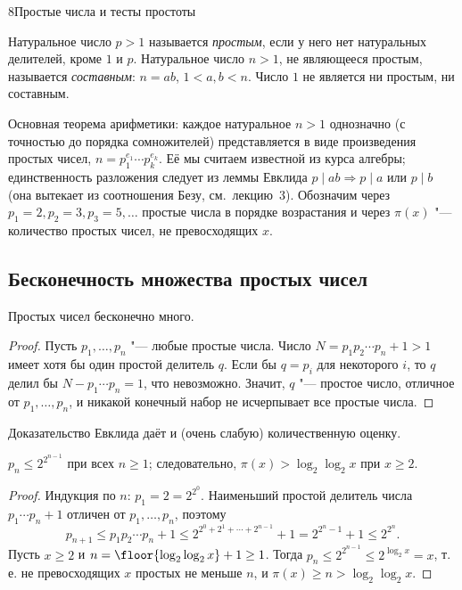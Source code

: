 \begin{lecture}{8}{Простые числа и тесты простоты}
\begin{definition}
Натуральное число $p > 1$ называется \emph{простым}, если у него нет натуральных делителей,
кроме $1$ и $p$. Натуральное число $n > 1$, не являющееся простым, называется \emph{составным}:
$n = ab$, $1 < a, b < n$. Число $1$ не является ни простым, ни составным.
\end{definition}

Основная теорема арифметики: каждое натуральное $n > 1$ однозначно (с точностью до порядка
сомножителей) представляется в виде произведения простых чисел, $n = p_1^{e_1} \cdots p_k^{e_k}$.
Её мы считаем известной из курса алгебры; единственность разложения следует из леммы Евклида
$p \mid ab \Rightarrow p \mid a$ или $p \mid b$ (она вытекает из соотношения Безу, см.\ лекцию~3).
Обозначим через $p_1 = 2, p_2 = 3, p_3 = 5, \ldots$ простые числа в порядке возрастания и через
$\pi(x)$ "--- количество простых чисел, не превосходящих $x$.

\subsection{Бесконечность множества простых чисел}

\begin{theorem}[Евклид]\label{l8:euclid}
Простых чисел бесконечно много.
\end{theorem}

\begin{proof}
Пусть $p_1, \ldots, p_n$ "--- любые простые числа. Число $N = p_1 p_2 \cdots p_n + 1 > 1$ имеет
хотя бы один простой делитель $q$. Если бы $q = p_i$ для некоторого $i$, то $q$ делил бы
$N - p_1 \cdots p_n = 1$, что невозможно. Значит, $q$ "--- простое число, отличное от
$p_1, \ldots, p_n$, и никакой конечный набор не исчерпывает все простые числа.
\end{proof}

Доказательство Евклида даёт и (очень слабую) количественную оценку.

\begin{corollary}\label{l8:loglog}
$p_n \le 2^{2^{n-1}}$ при всех $n \ge 1$; следовательно, $\pi(x) > \log_2 \log_2 x$ при $x \ge 2$.
\end{corollary}

\begin{proof}
Индукция по $n$: $p_1 = 2 = 2^{2^0}$. Наименьший простой делитель числа $p_1 \cdots p_n + 1$
отличен от $p_1, \ldots, p_n$, поэтому
\[
  p_{n+1} \le p_1 p_2 \cdots p_n + 1 \le 2^{2^0 + 2^1 + \cdots + 2^{n-1}} + 1 = 2^{2^n - 1} + 1
  \le 2^{2^n}.
\]
Пусть $x \ge 2$ и $n = \floor{\log_2 \log_2 x} + 1 \ge 1$. Тогда
$p_n \le 2^{2^{n-1}} \le 2^{\log_2 x} = x$, т.\,е. не превосходящих $x$ простых не меньше $n$, и
$\pi(x) \ge n > \log_2 \log_2 x$.
\end{proof}


\end{lecture}
